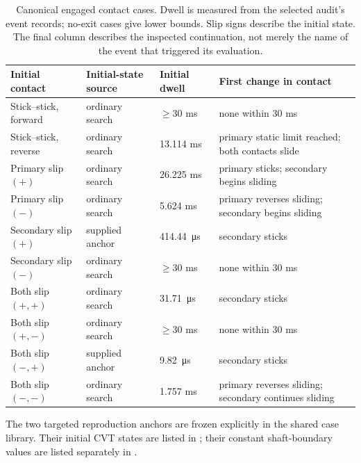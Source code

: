 \documentclass[11pt]{report}
\numberwithin{equation}{section}
\begin{document}
\begin{table}[H]
\centering
\small
\setlength{\tabcolsep}{4pt}
\renewcommand{\arraystretch}{1.15}
\begin{tabular}{@{}p{}p{}p{}p{}@{}}
\toprule
Initial contact & Initial-state source & Initial dwell & First change in contact \\ \midrule
Stick--stick, forward & ordinary search & $\geq30$ ms & none within 30 ms \\
Stick--stick, reverse & ordinary search & 13.114 ms & primary static limit reached; both contacts slide \\
Primary slip $(+)$ & ordinary search & 26.225 ms & primary sticks; secondary begins sliding \\
Primary slip $(-)$ & ordinary search & 5.624 ms & primary reverses sliding; secondary begins sliding \\
Secondary slip $(+)$ & supplied anchor & \SI{414.44}{\micro\second} & secondary sticks \\
Secondary slip $(-)$ & ordinary search & $\geq30$ ms & none within 30 ms \\
Both slip $(+,+)$ & ordinary search & \SI{31.71}{\micro\second} & secondary sticks \\
Both slip $(+,-)$ & ordinary search & $\geq30$ ms & none within 30 ms \\
Both slip $(-,+)$ & supplied anchor & \SI{9.82}{\micro\second} & secondary sticks \\
Both slip $(-,-)$ & ordinary search & 1.757 ms & primary reverses sliding; secondary continues sliding \\
\bottomrule
\end{tabular}
\caption{Canonical engaged contact cases. Dwell is measured from the selected
audit's event records; no-exit cases give lower bounds. Slip signs describe
the initial state. The final column describes the inspected continuation,
not merely the name of the event that triggered its evaluation.}
\label{tab:invariants_contact_cases}
\end{table}

The two targeted reproduction anchors are frozen explicitly in the shared case
library.  Their initial CVT states are listed in
; their constant shaft-boundary values
are listed separately in .
\end{document}
